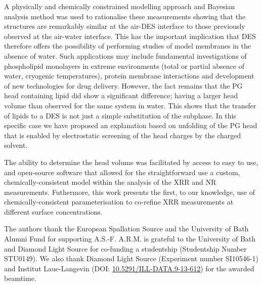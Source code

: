 \documentclass[twocolumn,a4paper]{paper}
\begin{document}
A physically and chemically constrained modelling approach and Bayesian analysis method was used to rationalise these measurements showing that the structures are remarkably similar at the air-DES interface to those previously observed at the air-water interface.
This has the important implication that DES therefore offers the possibility of performing studies of model membranes in the absence of water.
Such applications may include fundamental investigations of phospholipid monolayers in extreme environments (total or partial absence of water, cryogenic temperatures), protein membrane interactions and development of new technologies for drug delivery.
However, the fact remains that the PG head containing lipid did show a significant difference; having a larger head volume than observed for the same system in water.
This shows that the transfer of lipids to a DES is not just a simple substitution of the subphase. In this specific case we have proposed an explanation based on unfolding of the PG head that is enabled by electrostatic screening of the head charges by the charged solvent.

The ability to determine the head volume was facilitated by access to easy to use, and open-source software that allowed for the straightforward use a custom, chemically-consistent model within the analysis of the XRR and NR measurements.
Futhermore, this work presents the first, to our knowledge, use of chemically-consistent parameterisation to co-refine XRR measurements at different surface concentrations.

The authors thank the European Spallation Source and the University of Bath Alumni Fund for supporting A.S.-F. A.R.M. is grateful to the University of Bath and Diamond Light Source for co-funding a studentship (Studentship Number STU0149). We also thank Diamond Light Source (Experiment number SI10546-1) and Institut Laue-Langevin (DOI: \href{http://doi.org/10.5291/ILL-DATA.9-13-612}{10.5291/ILL-DATA.9-13-612}) for the awarded beamtime.


\end{document}
